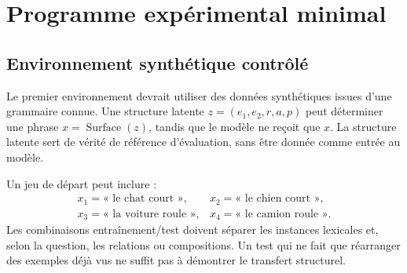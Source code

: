 \documentclass[11pt,a4paper]{article}
\theoremstyle{remark}
\newcommand{\1}{\mathbf 1}
\begin{document}
\section{Programme expérimental minimal}

\subsection{Environnement synthétique contrôlé}
Le premier environnement devrait utiliser des données synthétiques issues d'une grammaire connue. Une structure latente $z=(e_1,e_2,r,a,p)$ peut déterminer une phrase $x=\operatorname{Surface}(z)$, tandis que le modèle ne reçoit que $x$. La structure latente sert de vérité de référence d'évaluation, sans être donnée comme entrée au modèle.

Un jeu de départ peut inclure :
\[
\begin{array}{ll}
x_1=\text{« le chat court »}, & x_2=\text{« le chien court »},\\
x_3=\text{« la voiture roule »}, & x_4=\text{« le camion roule »}.
\end{array}
\]
Les combinaisons entraînement/test doivent séparer les instances lexicales et, selon la question, les relations ou compositions. Un test qui ne fait que réarranger des exemples déjà vus ne suffit pas à démontrer le transfert structurel.
\end{document}
